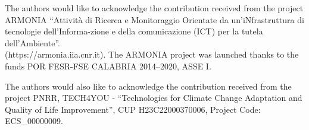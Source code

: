 \documentclass[10pt]{../imeko_acta}
\begin{document}
The authors would like to acknowledge the contribution received from the project ARMONIA ``Attività di Ricerca e Monitoraggio Orientate da un’iNfrastruttura di tecnologie dell’Informa-zione e della comunicazione (ICT) per la tutela dell’Ambiente''.\\ (https://armonia.iia.cnr.it). The ARMONIA project was launched thanks to the funds POR FESR-FSE CALABRIA 2014–2020, ASSE I. 

The authors would also like to acknowledge the contribution received from the project
PNRR, TECH4YOU - ``Technologies for Climate Change Adaptation and Quality of Life Improvement'', CUP H23C22000370006, Project Code: ECS\_00000009.



\end{document}
